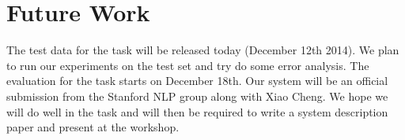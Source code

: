 \documentclass[conference]{IEEEtran}
\begin{document}
\section{Future Work}
The test data for the task will be released today (December 12th 2014). We plan to run our experiments on the test set and try do some error analysis. The evaluation for the task starts on December 18th. Our system will be an official submission from the Stanford NLP group along with Xiao Cheng. We hope we will do well in the task and will then be required to write a system description paper and present at the workshop.\\


\end{document}
